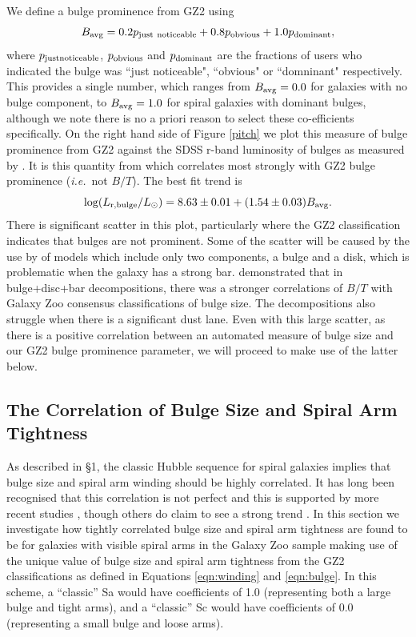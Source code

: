 \documentclass[usenatbib]{mn2e}
\newcommand{\ie}{{\it i.e.}}
\newcommand{\be}{\begin{equation}}
\newcommand{\ee}{\end{equation}}
\begin{document}
We define a bulge prominence from GZ2 using
\be
\label{eqn:bulge}
B_{\rm avg} = 0.2p_{\rm  just~noticeable} + 0.8p_{\rm obvious}+ 1.0p_{\rm dominant},
\ee
where $p_{\rm  just noticeable}$, $p_{\rm obvious}$ and $p_{\rm dominant}$ are the fractions of users who indicated the bulge was ``just noticeable", ``obvious" or ``domninant" respectively. This provides a single number, which ranges from $B_{\rm avg} = 0.0$ for galaxies with no bulge component, to $B_{\rm avg} = 1.0$ for spiral galaxies with dominant bulges, although we note there is no a priori reason to select these co-efficients specifically. On the right hand side of Figure \ref{pitch} we plot this measure of bulge prominence from GZ2 against the SDSS r-band luminosity of bulges as measured by \citet{Simard2011}. It is this quantity from \citet{Simard2011} which correlates most strongly with GZ2 bulge prominence (\ie ~not $B/T$).  The best fit trend is 
\be 
\log(L_{\rm r,bulge}/L_\odot) = 8.63\pm0.01 + (1.54\pm0.03) B_{\rm avg}.
\ee
There is significant scatter in this plot, particularly where the GZ2 classification indicates that bulges are not prominent. Some of the scatter will be caused by the use by \citet{Simard2011} of models which include only two components, a bulge and a disk, which is problematic when the galaxy has a strong bar. \citet{Kruk2018} demonstrated that in bulge+disc+bar decompositions, there was a stronger correlations of $B/T$ with Galaxy Zoo consensus classifications of bulge size. The \citet{Simard2011} decompositions also struggle when there is a significant dust lane. Even with this large scatter, as there is a positive correlation between an automated measure of bulge size and our GZ2 bulge prominence parameter, we will proceed to make use of the latter below. 
 
\subsection{The Correlation of Bulge Size and Spiral Arm Tightness}

As described in \S 1, the classic Hubble sequence for spiral galaxies implies that bulge size and spiral arm winding should be highly correlated. It has long been recognised that this correlation is not perfect \citep[e.g.][]{1970ApJ...160..811F, kennicutt1981} and this is supported by more recent studies \citep{Hart2017b,Hart2018}, though others do claim to see a strong trend \citep{Davis2015}. In this section we investigate how tightly correlated bulge size and spiral arm tightness are found to be for galaxies with visible spiral arms in the Galaxy Zoo sample making use of the unique value of bulge size and spiral arm tightness from the GZ2 classifications as defined in Equations \ref{eqn:winding} and \ref{eqn:bulge}. In this scheme, a ``classic'' Sa would have coefficients of 1.0 (representing both a large bulge and tight arms), and a ``classic'' Sc would have coefficients of 0.0 (representing a small bulge and loose arms). 
\end{document}
